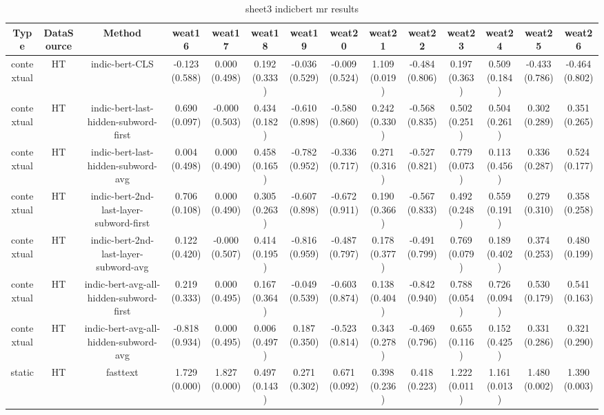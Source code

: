 \begin{sidewaystable}[htb]
    \centering
    \caption{sheet3 indicbert mr results}
    \label{appendix_tab:sheet3_indicbert_mr_results}
    \small
    \begin{tabular}{@{}cccccccccccccc@{}}
        \toprule
        Type & DataSource & Method & weat16 & weat17 & weat18 & weat19 & weat20 & weat21 & weat22 & weat23 & weat24 & weat25 & weat26 \\
        \midrule
        contextual & HT & indic-bert-CLS & -0.123 (0.588) & 0.000 (0.498) & 0.192 (0.333) & -0.036 (0.529) & -0.009 (0.524) & 1.109 (0.019) & -0.484 (0.806) & 0.197 (0.363) & 0.509 (0.184) & -0.433 (0.786) & -0.464 (0.802) \\
        contextual & HT & indic-bert-last-hidden-subword-first & 0.690 (0.097) & -0.000 (0.503) & 0.434 (0.182) & -0.610 (0.898) & -0.580 (0.860) & 0.242 (0.330) & -0.568 (0.835) & 0.502 (0.251) & 0.504 (0.261) & 0.302 (0.289) & 0.351 (0.265) \\
        contextual & HT & indic-bert-last-hidden-subword-avg & 0.004 (0.498) & 0.000 (0.490) & 0.458 (0.165) & -0.782 (0.952) & -0.336 (0.717) & 0.271 (0.316) & -0.527 (0.821) & 0.779 (0.073) & 0.113 (0.456) & 0.336 (0.287) & 0.524 (0.177) \\
        contextual & HT & indic-bert-2nd-last-layer-subword-first & 0.706 (0.108) & 0.000 (0.490) & 0.305 (0.263) & -0.607 (0.898) & -0.672 (0.911) & 0.190 (0.366) & -0.567 (0.833) & 0.492 (0.248) & 0.559 (0.191) & 0.279 (0.310) & 0.358 (0.258) \\
        contextual & HT & indic-bert-2nd-last-layer-subword-avg & 0.122 (0.420) & -0.000 (0.507) & 0.414 (0.195) & -0.816 (0.959) & -0.487 (0.797) & 0.178 (0.377) & -0.491 (0.799) & 0.769 (0.079) & 0.189 (0.402) & 0.374 (0.253) & 0.480 (0.199) \\
        contextual & HT & indic-bert-avg-all-hidden-subword-first & 0.219 (0.333) & 0.000 (0.495) & 0.167 (0.364) & -0.049 (0.539) & -0.603 (0.874) & 0.138 (0.404) & -0.842 (0.940) & 0.788 (0.054) & 0.726 (0.094) & 0.530 (0.179) & 0.541 (0.163) \\
        contextual & HT & indic-bert-avg-all-hidden-subword-avg & -0.818 (0.934) & 0.000 (0.495) & 0.006 (0.497) & 0.187 (0.350) & -0.523 (0.814) & 0.343 (0.278) & -0.469 (0.796) & 0.655 (0.116) & 0.152 (0.425) & 0.331 (0.286) & 0.321 (0.290) \\
        static & HT & fasttext & 1.729 (0.000) & 1.827 (0.000) & 0.497 (0.143) & 0.271 (0.302) & 0.671 (0.092) & 0.398 (0.236) & 0.418 (0.223) & 1.222 (0.011) & 1.161 (0.013) & 1.480 (0.002) & 1.390 (0.003) \\

\end{tabular}
\end{sidewaystable}
